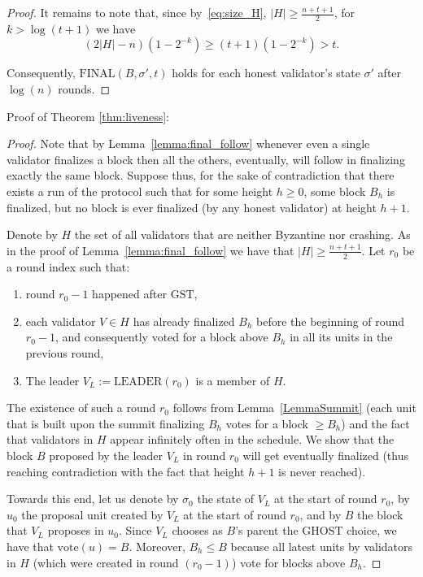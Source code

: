\documentclass[12pt, fleqn]{article}
\newcommand{\vote}{\mathrm{vote}}
\newcommand{\final}{\mathrm{FINAL}}
\newcommand{\leader}{\mathrm{LEADER}}
\newcommand{\gst}{\mathrm{GST}}
\begin{document}
\begin{proof}
It remains to note that, since by~\eqref{eq:size_H}, $|H|\geq  \frac{n+t+1}{2}$, for $k>\log(t+1)$ we have
$$(2|H|-n)(1-2^{-k}) \geq (t+1)(1-2^{-k})>t.$$

Consequently, $\final(B, \sigma', t)$ holds for each honest validator's state $\sigma'$ after $\log(n)$ rounds.

\end{proof}

Proof of Theorem \ref{thm:liveness}:


\begin{proof}
Note that by Lemma~\ref{lemma:final_follow} whenever even a single validator finalizes a block then all the others, eventually, will follow in finalizing exactly the same block.
%
Suppose thus, for the sake of contradiction that there exists a run of the protocol such that for some height $h\geq 0$, some block $B_h$ is finalized, but no block is ever finalized (by any honest validator) at height $h+1$.
%

Denote by $H$ the set of all validators that are neither Byzantine nor crashing. As in the proof of Lemma~\ref{lemma:final_follow} we have that $|H|\geq  \frac{n+t+1}{2}.$
%
Let $r_0$ be a round index such that:
\begin{enumerate}
    \item round $r_0-1$ happened after $\gst$,
    \item each validator $V\in H$ has already finalized $B_h$ before the beginning of round $r_0-1$, and consequently voted for a block above $B_h$ in all its units in the previous round,
    \item The leader $V_L:=\leader(r_0)$ is a member of $H$.
\end{enumerate}
The existence of such a round $r_0$ follows from Lemma~\ref{LemmaSummit} (each unit that is built upon the summit finalizing $B_h$ votes for a block $\geq B_h$) and the fact that validators in $H$ appear infinitely often in the schedule.
%
We show that the block $B$ proposed by the leader $V_L$ in round $r_0$ will get eventually finalized (thus reaching contradiction with the fact that height $h+1$ is never reached).

Towards this end, let us denote by $\sigma_0$ the state of $V_L$ at the start of round $r_0$, by $u_0$ the proposal unit created by $V_L$ at the start of round $r_0$, and by $B$ the block that $V_L$ proposes in $u_0$.
%
Since $V_L$ chooses as $B$'s parent the GHOST choice, we have that $\vote(u)=B$.
%
Moreover, $B_h \leq B$ because all latest units by validators in $H$ (which were created in round $(r_0-1)$) vote for blocks above $B_h$.


\end{proof}
\end{document}
